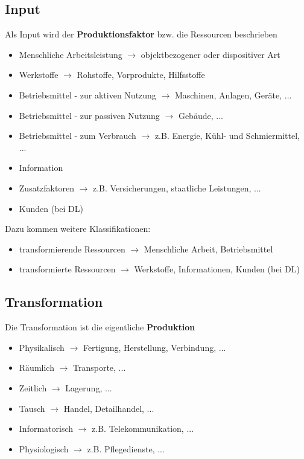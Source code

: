 \documentclass{report}
\theoremstyle{definition}
\theoremstyle{example}
\begin{document}
   \subsection{Input}
Als Input wird der \textbf{Produktionsfaktor} bzw. die Ressourcen beschrieben
\begin{itemize}
   \item Menschliche Arbeitsleistung $\rightarrow$ objektbezogener oder dispositiver Art 
   \item Werkstoffe $\rightarrow$ Rohstoffe, Vorprodukte, Hilfsstoffe
   \item Betriebsmittel - zur aktiven Nutzung $\rightarrow$ Maschinen, Anlagen, Geräte, ...
   \item Betriebsmittel - zur passiven Nutzung $\rightarrow$ Gebäude, ...
   \item Betriebsmittel - zum Verbrauch $\rightarrow$ z.B. Energie, Kühl- und Schmiermittel, ...
   \item Information
   \item Zusatzfaktoren $\rightarrow$ z.B. Versicherungen, staatliche Leistungen, ...
   \item Kunden (bei DL)
\end{itemize}
Dazu kommen weitere Klassifikationen:
\begin{itemize}
   \item transformierende Ressourcen $\rightarrow$ Menschliche Arbeit, Betriebsmittel
   \item transformierte Ressourcen $\rightarrow$ Werkstoffe, Informationen, Kunden (bei DL)
\end{itemize}

   \subsection{Transformation}
Die Transformation ist die eigentliche \textbf{Produktion}
\begin{itemize}
   \item Physikalisch $\rightarrow$ Fertigung, Herstellung, Verbindung, ...
   \item Räumlich $\rightarrow$ Transporte, ...
   \item Zeitlich $\rightarrow$ Lagerung, ...
   \item Tausch $\rightarrow$ Handel, Detailhandel, ...
   \item Informatorisch $\rightarrow$ z.B. Telekommunikation, ...
   \item Physiologisch $\rightarrow$ z.B. Pflegedienste, ...
\end{itemize}
\end{document}
